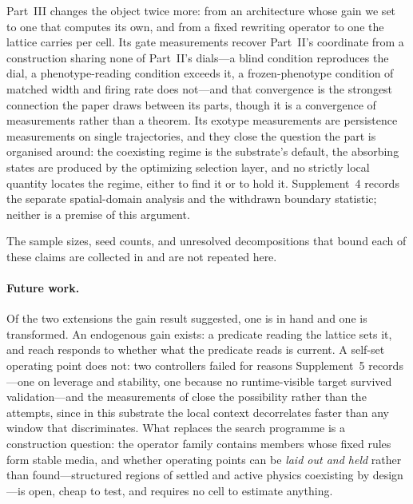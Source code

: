 \documentclass[man,12pt,floatsintext,donotrepeattitle]{apa7}
\newcommand{\secref}[1]{\emph{\nameref{#1}}}
\begin{document}
Part~III changes the object twice more: from an architecture whose gain we set
to one that computes its own, and from a fixed rewriting operator to one the
lattice carries per cell. Its gate measurements recover Part~II's coordinate
from a construction sharing none of Part~II's dials---a blind condition
reproduces the dial, a phenotype-reading condition exceeds it, a
frozen-phenotype condition of matched width and firing rate does not---and that
convergence is the strongest connection the paper draws between its parts,
though it is a convergence of measurements rather than a theorem. Its exotype
measurements are persistence measurements on single trajectories, and they
close the question the part is organised around: the coexisting regime is the
substrate's default, the absorbing states are produced by the optimizing
selection layer, and no strictly local quantity locates the regime, either to
find it or to hold it. Supplement~4 records the separate spatial-domain
analysis and the withdrawn boundary statistic; neither is a premise of this
argument.

The sample sizes, seed counts, and unresolved decompositions that bound each of
these claims are collected in \secref{sec:limits} and are not repeated here.

\paragraph{Future work.} Of the two extensions the gain result suggested, one is
in hand and one is transformed. An endogenous gain exists: a predicate reading
the lattice sets it, and reach responds to whether what the predicate reads is
current. A self-set operating point does not: two controllers failed for
reasons Supplement~5 records---one on leverage and stability, one because no
runtime-visible target survived validation---and the measurements of
\secref{sec:exotype-question} close the possibility rather than the attempts,
since in this substrate the local context decorrelates faster than any window
that discriminates. What replaces the search programme is a construction
question: the operator family contains members whose fixed rules form stable
media, and whether operating points can be \emph{laid out and held} rather than
found---structured regions of settled and active physics coexisting by
design---is open, cheap to test, and requires no cell to estimate anything.
\end{document}
